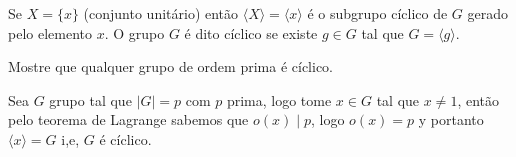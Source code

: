 \begin{homeworkProblem}
  Se $X=\{x\}$ (conjunto unitário) então $\langle X \rangle = \langle x \rangle$ é o subgrupo cíclico de $G$ gerado pelo elemento $x$. O grupo $G$ é dito cíclico se existe $g\in G$ tal que $G=\langle g\rangle$.

  Mostre que qualquer grupo de ordem prima é cíclico.
  \begin{solution}
    Sea $G$ grupo tal que $|G|=p$ com $p$ prima, logo tome $x\in G$ tal que $x\neq 1$, então pelo teorema de Lagrange sabemos que $o(x)\mid p$, logo $o(x)=p$ y portanto $\langle x\rangle = G$ i,e, $G$ é cíclico.  
  \end{solution}
\end{homeworkProblem}
